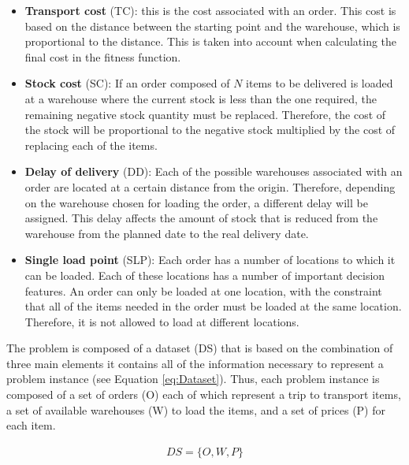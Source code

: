 \documentclass[letterpaper]{article} %
\begin{document}
\begin{itemize}
  \item \textbf{Transport cost }(TC): this is the cost associated with an order. This cost is based on the distance between the starting point and the warehouse, which is proportional to the distance. This is taken into account when calculating the final cost in the fitness function.
  \item \textbf{Stock cost }(SC): If an order composed of $N$ items to be delivered is loaded at a warehouse where the current stock is less than the one required, the remaining negative stock quantity must be replaced. Therefore, the cost of the stock will be proportional to the negative stock multiplied by the cost of replacing each of the items.
  \item \textbf{Delay of delivery }(DD): Each of the possible warehouses associated with an order are located at a certain distance from the origin. Therefore, depending on the warehouse chosen for loading the order, a different delay will be assigned. This delay affects the amount of stock that is reduced from the warehouse from the planned date to the real delivery date.
  \item \textbf{Single load point }(SLP): Each order has a number of locations to which it can be loaded. Each of these locations has a number of important decision features. An order can only be loaded at one location, with the constraint that all of the items needed in the order must be loaded at the same location. Therefore, it is not allowed to load at different locations.
\end{itemize}

The problem is composed of a dataset (DS) that is based on the combination of three main elements it contains all of the information necessary to represent a problem instance (see Equation \ref{eq:Dataset}). Thus, each problem instance is composed of a set of orders (O) each of which represent a trip to transport items, a set of available warehouses (W) to load the items, and a set of prices (P) for each item. 

\begin{equation}\label{eq:Dataset}
    \begin{aligned}
        DS = \{O, W, P\} \\
    \end{aligned}
\end{equation}
  
\end{document}
